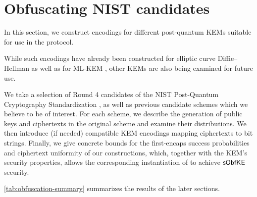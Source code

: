 \chapter{Obfuscating NIST candidates}\label{ch:obfuscation}

In this section, we construct encodings for different post-quantum KEMs suitable for use in the \drivel{} protocol.

While such encodings have already been constructed for elliptic curve Diffie–Hellman \cite{EC:vAhHop04,tor-dev-udh,USENIX:WWGH11,CCS:BHKL13,FC:Tibouchi14} as well as for ML-KEM \cite{CCS:GunSteVei24}, other KEMs are also being examined for future use.

We take a selection of Round 4 candidates of the NIST Post-Quantum Cryptography Standardization \cite{nist-standardization}, as well as previous candidate schemes which we believe to be of interest.
For each scheme, we describe the generation of public keys and ciphertexts in the original scheme and examine their distributions. We then introduce (if needed) compatible KEM encodings mapping ciphertexts to bit strings. Finally, we give concrete bounds for the first-encaps success probabilities and ciphertext uniformity of our constructions, which, together with the KEM's security properties, allows the corresponding instantiation of \drivel{} to achieve $\mathsf{sObfKE}$ security.

\cref{tab:obfuscation-summary} summarizes the results of the later sections.

